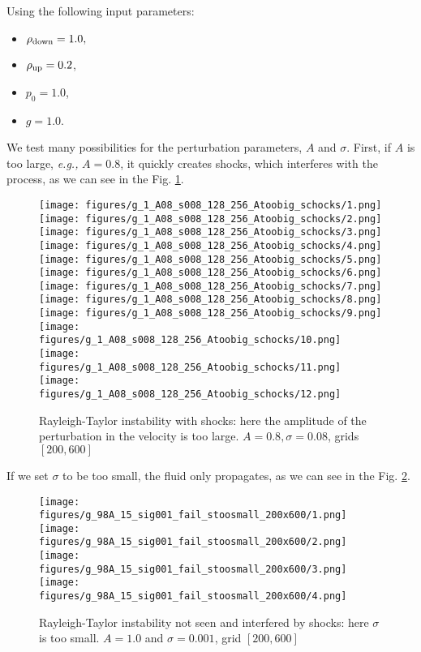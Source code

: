\documentclass[10pt]{article}
\newcommand{\eg}{{\it e.g., }}
\begin{document}
\quad

Using the following input parameters:
\begin{itemize}
\item $\rho_{\rm down} = 1.0, $
\item $\rho_{\rm up} =0.2$,
\item $p_0 = 1.0$,
\item $g =1.0$.
\end{itemize}


\quad 

We test many possibilities for the perturbation parameters, $A$ and $\sigma$. First, if $A$ is too large, \eg $A=0.8$, it quickly creates shocks, which interferes with the process, as we can see in the Fig. \ref{ev}.

\quad

\begin{figure} [ht]
\begin{center}
\texttt{[image: figures/g\_1\_A08\_s008\_128\_256\_Atoobig\_schocks/1.png]}
\texttt{[image: figures/g\_1\_A08\_s008\_128\_256\_Atoobig\_schocks/2.png]}
\texttt{[image: figures/g\_1\_A08\_s008\_128\_256\_Atoobig\_schocks/3.png]}
\texttt{[image: figures/g\_1\_A08\_s008\_128\_256\_Atoobig\_schocks/4.png]}
\texttt{[image: figures/g\_1\_A08\_s008\_128\_256\_Atoobig\_schocks/5.png]}
\texttt{[image: figures/g\_1\_A08\_s008\_128\_256\_Atoobig\_schocks/6.png]}
\texttt{[image: figures/g\_1\_A08\_s008\_128\_256\_Atoobig\_schocks/7.png]}
\texttt{[image: figures/g\_1\_A08\_s008\_128\_256\_Atoobig\_schocks/8.png]}
\texttt{[image: figures/g\_1\_A08\_s008\_128\_256\_Atoobig\_schocks/9.png]}
\texttt{[image: figures/g\_1\_A08\_s008\_128\_256\_Atoobig\_schocks/10.png]}
\texttt{[image: figures/g\_1\_A08\_s008\_128\_256\_Atoobig\_schocks/11.png]} 
\texttt{[image: figures/g\_1\_A08\_s008\_128\_256\_Atoobig\_schocks/12.png]}
\caption{Rayleigh-Taylor instability with shocks: here the amplitude of the perturbation in the velocity is too large. $A=0.8, \sigma=0.08$, grids $[200,600]$}
\label{ev}
\end{center}
\end{figure}


\quad


If we set $\sigma$ to be too small, the fluid only propagates, as we can see in the Fig. \ref{ev2}.

\quad

\begin{figure} [ht]
\begin{center}
\texttt{[image: figures/g\_98A\_15\_sig001\_fail\_stoosmall\_200x600/1.png]}
\texttt{[image: figures/g\_98A\_15\_sig001\_fail\_stoosmall\_200x600/2.png]}
\texttt{[image: figures/g\_98A\_15\_sig001\_fail\_stoosmall\_200x600/3.png]}
\texttt{[image: figures/g\_98A\_15\_sig001\_fail\_stoosmall\_200x600/4.png]}
\caption{Rayleigh-Taylor instability not seen and interfered by shocks: here $\sigma$  is too small. $A=1.0$ and $\sigma=0.001$, grid $[200,600]$}
\label{ev2}
\end{center}
\end{figure}
\end{document}
